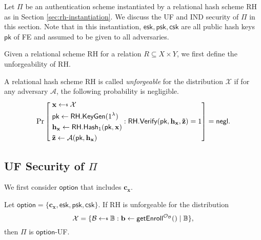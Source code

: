 


Let $\Pi$ be an authentication scheme instantiated by a relational hash scheme \textsf{RH} as in Section \ref{sec:rh-instantiation}. We discuss the UF and IND security of $\Pi$ in this section. Note that in this instantiation, $\textsf{esk}, \textsf{psk}, \textsf{csk}$ are all public hash keys $\textsf{pk}$ of \textsf{FE} and assumed to be given to all adversaries.

Given a relational scheme \textsf{RH} for a relation $R \subseteq X \times Y$, we first define the unforgeability \cite{cryptoeprint:2014/394} of \textsf{RH}.

\begin{definition}[Unforgeability]

A relational hash scheme \textsf{RH} is called \emph{unforgeable} for the distribution $\mathcal{X}$ if for any adversary $\mathcal{A}$, the following probability is negligible.
\[
	\Pr \left [
		\begin{aligned} 
			 &\; \mathbf{x} \getsdollar \mathcal{X} \\
			 &\; \textsf{pk} \gets \textsf{RH.KeyGen}(1^\lambda) \\
			 &\; \mathbf{h_x} \gets \textsf{RH.Hash}_1(\textsf{pk}, \mathbf{x}) \\
			 &\; \mathbf{\tilde{z}} \gets \mathcal{A}(\textsf{pk}, \mathbf{h_x})
		\end{aligned} :
		\textsf{RH.Verify}(\textsf{pk}, \mathbf{h_x}, \mathbf{\tilde{z}}) = 1
		\right ] = \negl.
\]

\end{definition}



\subsection{UF Security of $\Pi$}
\label{sec:security_analysis:rh:uf}

We first consider $\textsf{option}$ that includes $\mathbf{c_x}$.


\begin{theorem}
\label{thm:rh:uf-uf-cx}

Let $\textsf{option} = \{\mathbf{c_x}, \textsf{esk}, \textsf{psk}, \textsf{csk}\}$. If \textsf{RH} is unforgeable for the distribution
\[
	\mathcal{X} = \{ \mathcal{B} \getsdollar \mathbb{B}: \mathbf{b} \gets {\sf getEnroll}^{\mathcal{O}_\mathcal{B}}() \mid \mathbb{B} \},
\]
then $\Pi$ is $\textsf{option}$-UF. 

\end{theorem}

